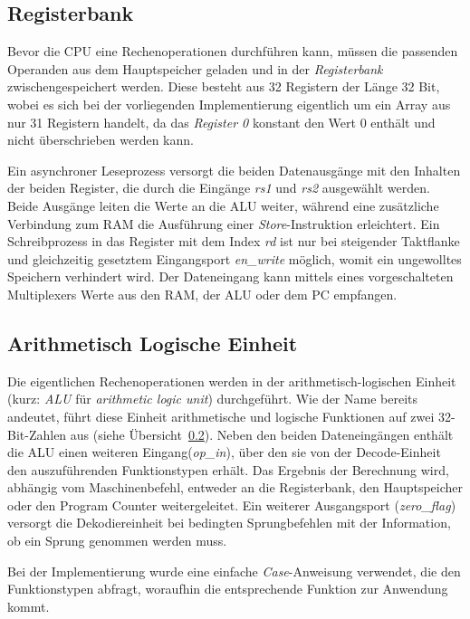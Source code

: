 \subsection{Registerbank}

Bevor die CPU eine Rechenoperationen durchführen kann, müssen die passenden Operanden aus dem Hauptspeicher geladen und in der \textit{Registerbank} zwischengespeichert werden.
Diese besteht aus 32 Registern der Länge 32 Bit, wobei es sich bei der vorliegenden Implementierung eigentlich um ein Array aus nur 31 Registern handelt, da das \textit{Register 0} konstant den Wert $0$ enthält und nicht überschrieben werden kann.

Ein asynchroner Leseprozess versorgt die beiden Datenausgänge mit den Inhalten der beiden Register, die durch die Eingänge \textit{rs1} und \textit{rs2} ausgewählt werden.
Beide Ausgänge leiten die Werte an die ALU weiter, während eine zusätzliche Verbindung zum RAM die Ausführung einer \textit{Store}-Instruktion erleichtert.
Ein Schreibprozess in das Register mit dem Index \textit{rd} ist nur bei steigender Taktflanke und gleichzeitig gesetztem Eingangsport \textit{en\_write} möglich, womit ein ungewolltes Speichern verhindert wird.
Der Dateneingang kann mittels eines vorgeschalteten Multiplexers Werte aus den RAM, der ALU oder dem PC empfangen.



\subsection{Arithmetisch Logische Einheit}

Die eigentlichen Rechenoperationen werden in der arithmetisch-logischen Einheit (kurz: \textit{ALU} für \textit{arithmetic logic unit}) durchgeführt.
Wie der Name bereits andeutet, führt diese Einheit arithmetische und logische Funktionen auf zwei 32-Bit-Zahlen aus (siehe Übersicht~\ref{}).
Neben den beiden Dateneingängen enthält die ALU einen weiteren Eingang(\textit{op\_in}), über den sie von der Decode-Einheit den auszuführenden Funktionstypen erhält.
Das Ergebnis der Berechnung wird, abhängig vom Maschinenbefehl, entweder an die Registerbank, den Hauptspeicher oder den Program Counter weitergeleitet.
Ein weiterer Ausgangsport (\textit{zero\_flag}) versorgt die Dekodiereinheit bei bedingten Sprungbefehlen mit der Information, ob ein Sprung genommen werden muss. 

Bei der Implementierung wurde eine einfache \textit{Case}-Anweisung verwendet, die den Funktionstypen abfragt, woraufhin die entsprechende Funktion zur Anwendung kommt.

